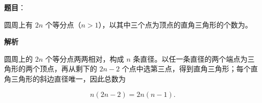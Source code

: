 \begin{answer}

\textbf{题目}：

圆周上有 $2n$ 个等分点（$n>1$），以其中三个点为顶点的直角三角形的个数为\gkblank{}。

\textbf{解析}

圆周上的 $2n$ 个等分点两两相对，构成 $n$ 条直径。以任一条直径的两个端点为三角形的两个顶点，再从剩下的 $2n-2$ 个点中选第三点，得到直角三角形；每个直角三角形的斜边直径唯一，因此总数为

\nopagebreak[4]
\[
n(2n-2)=2n(n-1).
\]


\end{answer}

